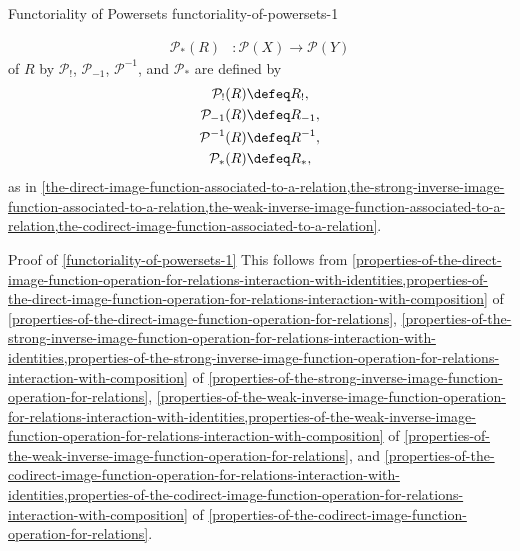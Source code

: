 \begin{proposition}{Functoriality of Powersets \rmI}{functoriality-of-powersets-1}
\begin{itemize}
\begin{align*}
                \mathcal{P}_{*}(R)  &\colon \mathcal{P}(X) \to \mathcal{P}(Y)%
            \end{align*}
            of $R$ by $\mathcal{P}_{!}$, $\mathcal{P}_{-1}$, $\mathcal{P}^{-1}$, and $\mathcal{P}_{*}$ are defined by
            \begin{align*}
                \mathcal{P}_{!}(R)  &\defeq R_{!},\\%
                \mathcal{P}_{-1}(R) &\defeq R_{-1},\\%
                \mathcal{P}^{-1}(R) &\defeq R^{-1},\\%
                \mathcal{P}_{*}(R)  &\defeq R_{*},%
            \end{align*}
            as in \cref{the-direct-image-function-associated-to-a-relation,the-strong-inverse-image-function-associated-to-a-relation,the-weak-inverse-image-function-associated-to-a-relation,the-codirect-image-function-associated-to-a-relation}.
    \end{itemize}
\end{proposition}
\begin{Proof}{Proof of \cref{functoriality-of-powersets-1}}%
    This follows from \cref{properties-of-the-direct-image-function-operation-for-relations-interaction-with-identities,properties-of-the-direct-image-function-operation-for-relations-interaction-with-composition} of \cref{properties-of-the-direct-image-function-operation-for-relations}, \cref{properties-of-the-strong-inverse-image-function-operation-for-relations-interaction-with-identities,properties-of-the-strong-inverse-image-function-operation-for-relations-interaction-with-composition} of \cref{properties-of-the-strong-inverse-image-function-operation-for-relations}, \cref{properties-of-the-weak-inverse-image-function-operation-for-relations-interaction-with-identities,properties-of-the-weak-inverse-image-function-operation-for-relations-interaction-with-composition} of \cref{properties-of-the-weak-inverse-image-function-operation-for-relations}, and \cref{properties-of-the-codirect-image-function-operation-for-relations-interaction-with-identities,properties-of-the-codirect-image-function-operation-for-relations-interaction-with-composition} of \cref{properties-of-the-codirect-image-function-operation-for-relations}.
\end{Proof}
